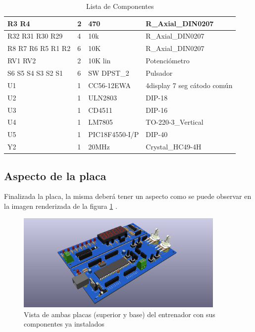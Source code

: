 \begin{table}[htb]
\begin{tabular}{|p{}|p{}|p{}|p{}|}
		R3 R4 & 2 & 470 & R\_Axial\_DIN0207 \\ \hline
		R32 R31 R30 R29 & 4 & 10k & R\_Axial\_DIN0207 \\ \hline
		R8 R7 R6 R5 R1 R2 & 6 & 10K & R\_Axial\_DIN0207 \\ \hline
		RV1 RV2 & 2 & 10K lin & Potenciómetro \\ \hline
		S6 S5 S4 S3 S2 S1 & 6 & SW DPST\_2 & Pulsador \\ \hline
		U1 & 1 & CC56-12EWA & 4display 7 seg cátodo común \\ \hline
		U2 & 1 & ULN2803 & DIP-18 \\ \hline
		U3 & 1 & CD4511 & DIP-16 \\ \hline
		U4 & 1 & LM7805 & TO-220-3\_Vertical \\ \hline
		U5 & 1 & PIC18F4550-I/P & DIP-40 \\ \hline
		Y2 & 1 & 20MHz & Crystal\_HC49-4H \\ \hline
	\end{tabular}
	\caption{Lista de Componentes}
	\label{ListaComponentes}
\end{table}
\pagebreak%
\subsection{Aspecto de la placa}
Finalizada la placa, la misma deberá tener un aspecto como se puede observar en la imagen renderizada de la figura \ref{posterEntrenador} . 
\begin{figure}[htb]

	\centering\includegraphics[width=0.9\textwidth,clip=true]{Entrenador1-SchDoc_4Display_en_uno}

	\caption{Vista de ambas placas (superior y base) del entrenador con sus componentes ya instalados}\label{posterEntrenador}
\end{figure}



	




